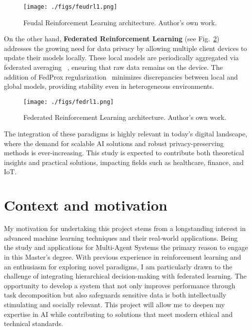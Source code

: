 \documentclass[12pt,a4paper,twoside,openany]{book}
\begin{document}
\begin{figure}[h]
\centering
\texttt{[image: ./figs/feudrl1.png]}
\captionsetup{font=small}
\caption{Feudal Reinforcement Learning architecture. Author's own work.}
\label{fig:feudrl1}
\end{figure}

On the other hand, \textbf{Federated Reinforcement Learning} (see Fig.~\ref{fig:fedrl1})  addresses the growing need for data privacy by allowing multiple client devices to update their models locally. These local models are periodically aggregated via federated averaging ~\cite{McMahan2016}, ensuring that raw data remains on the device. The addition of FedProx regularization~\cite{Li2020} minimizes discrepancies between local and global models, providing stability even in heterogeneous environments.

\begin{figure}[h]
\centering
\texttt{[image: ./figs/fedrl1.png]}
\captionsetup{font=small}
\caption{Federated Reinforcement Learning architecture. Author's own work.}
\label{fig:fedrl1}
\end{figure}

The integration of these paradigms is highly relevant in today’s digital landscape, where the demand for scalable AI solutions and robust privacy-preserving methods is ever-increasing. This study is expected to contribute both theoretical insights and practical solutions, impacting fields such as healthcare, finance, and IoT.


\section{Context and motivation}

My motivation for undertaking this project stems from a longstanding interest in advanced machine learning techniques and their real-world applications. Being the study and applications for Multi-Agent Systems the primary reason to engage in this Master's degree.
With previous experience in reinforcement learning and an enthusiasm for exploring novel paradigms, I am particularly drawn to the challenge of integrating hierarchical decision-making with federated learning. The opportunity to develop a system that not only improves performance through task decomposition but also safeguards sensitive data is both intellectually stimulating and socially relevant. This project will allow me to deepen my expertise in AI while contributing to solutions that meet modern ethical and technical standards.
\end{document}

